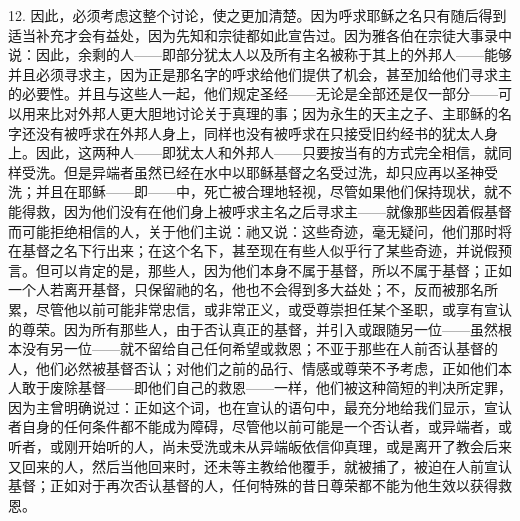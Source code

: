 12. 因此，必须考虑这整个讨论，使之更加清楚。因为呼求耶稣之名只有随后得到适当补充才会有益处，因为先知和宗徒都如此宣告过。因为雅各伯在宗徒大事录中说：因此，余剩的人——即部分犹太人以及所有主名被称于其上的外邦人——能够并且必须寻求主，因为正是那名字的呼求给他们提供了机会，甚至加给他们寻求主的必要性。并且与这些人一起，他们规定圣经——无论是全部还是仅一部分——可以用来比对外邦人更大胆地讨论关于真理的事；因为永生的天主之子、主耶稣的名字还没有被呼求在外邦人身上，同样也没有被呼求在只接受旧约经书的犹太人身上。因此，这两种人——即犹太人和外邦人——只要按当有的方式完全相信，就同样受洗。但是异端者虽然已经在水中以耶稣基督之名受过洗，却只应再以圣神受洗；并且在耶稣——即——中，死亡被合理地轻视，尽管如果他们保持现状，就不能得救，因为他们没有在他们身上被呼求主名之后寻求主——就像那些因着假基督而可能拒绝相信的人，关于他们主说：祂又说：这些奇迹，毫无疑问，他们那时将在基督之名下行出来；在这个名下，甚至现在有些人似乎行了某些奇迹，并说假预言。但可以肯定的是，那些人，因为他们本身不属于基督，所以不属于基督；正如一个人若离开基督，只保留祂的名，他也不会得到多大益处；不，反而被那名所累，尽管他以前可能非常忠信，或非常正义，或受尊崇担任某个圣职，或享有宣认的尊荣。因为所有那些人，由于否认真正的基督，并引入或跟随另一位——虽然根本没有另一位——就不留给自己任何希望或救恩；不亚于那些在人前否认基督的人，他们必然被基督否认；对他们之前的品行、情感或尊荣不予考虑，正如他们本人敢于废除基督——即他们自己的救恩——一样，他们被这种简短的判决所定罪，因为主曾明确说过：正如这个词，也在宣认的语句中，最充分地给我们显示，宣认者自身的任何条件都不能成为障碍，尽管他以前可能是一个否认者，或异端者，或听者，或刚开始听的人，尚未受洗或未从异端皈依信仰真理，或是离开了教会后来又回来的人，然后当他回来时，还未等主教给他覆手，就被捕了，被迫在人前宣认基督；正如对于再次否认基督的人，任何特殊的昔日尊荣都不能为他生效以获得救恩。\par

